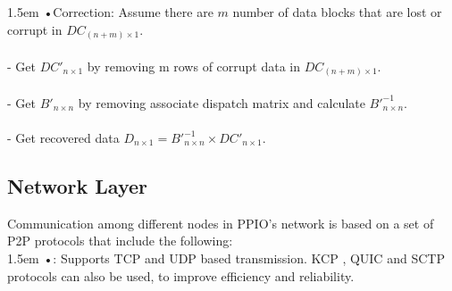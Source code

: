 \documentclass[10pt,a4paper]{article}
\begin{document}
\hangindent 1.5em
\noindent   
•\quad Correction: Assume there are $m$ number of data blocks that are lost or corrupt in $DC_{(n+m) \times 1}$.
\vspace{-1em}
\\\\
- Get $DC'_{n \times 1}$ by removing m rows of corrupt data in $DC_{(n+m) \times 1}$.
\vspace{-1em}
\\\\
- Get $B'_{n \times n}$ by removing associate dispatch matrix and calculate $B'^{-1}_{n \times n}$.
\vspace{-1em}
\\\\
- Get recovered data $D_{n \times 1} = B'^{-1}_{n \times n} \times DC'_{n \times 1}$.
\vspace{-0.5em}


        \subsection{Network Layer}  %
Communication among different nodes in PPIO’s network is based on a set of P2P protocols that include the following:
\vspace{-0.8em}
\\

\hangindent 1.5em
\noindent   
•: Supports TCP and UDP based transmission. KCP \cite{article8}, QUIC \cite{article9} and SCTP \cite{article10} protocols can also be used, to improve efficiency and reliability.
\vspace{-0.8em}
\\
\end{document}
